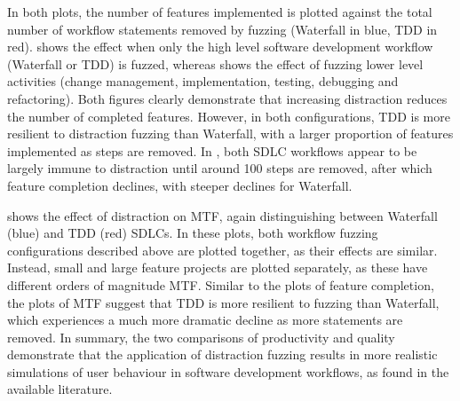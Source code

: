 \documentclass{llncs}
\begin{document}
%
In both plots, the number of features implemented is plotted against the total number of workflow statements removed by
fuzzing (Waterfall in blue, TDD in red).  shows the effect when only the high level
software development workflow (Waterfall or TDD) is fuzzed, whereas  shows the effect
of fuzzing lower level activities (change management, implementation, testing, debugging and refactoring). Both figures
clearly demonstrate that increasing distraction reduces the number of completed features. However, in both
configurations, TDD is more resilient to distraction fuzzing than Waterfall, with a larger proportion of features
implemented as steps are removed. In , both SDLC workflows appear to be largely immune to
distraction until around 100 steps are removed, after which feature completion declines, with steeper declines for
Waterfall.

 shows the effect of distraction on MTF, again distinguishing between Waterfall (blue) and TDD
(red) SDLCs.  In these plots, both workflow fuzzing configurations described above are plotted together, as their
effects are similar.  Instead, small and large feature projects are plotted separately, as these have different orders
of magnitude MTF.  Similar to the plots of feature completion, the plots of MTF suggest that TDD is more resilient to
fuzzing than Waterfall, which experiences a much more dramatic decline as more statements are removed.  In summary, the
two comparisons of productivity and quality demonstrate that the application of distraction fuzzing results in more
realistic simulations of user behaviour in software development workflows, as found in the available literature.
\end{document}
